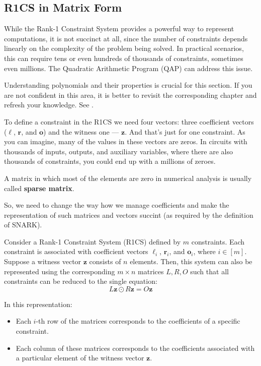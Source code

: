 \documentclass[../lecture-notes-148x210.tex]{subfiles}
\begin{document}
\subsection{R1CS in Matrix Form}

While the Rank-1 Constraint System provides a powerful way to represent computations, it is not 
succinct at all, since the number of constraints depends linearly on the complexity of the problem 
being solved. In practical scenarios, this can require tens or even hundreds of thousands of 
constraints, sometimes even millions. The Quadratic Arithmetic Program (QAP) can address this issue.

\begin{remark}
    Understanding polynomials and their properties is crucial for this section.
    If you are not confident in this area, it is better to revisit the
    corresponding chapter and refresh your knowledge. See
    .
\end{remark}

To define a constraint in the R1CS we need four vectors: three coefficient
vectors ($\boldsymbol{\ell}$, $\boldsymbol{r}$, and $\boldsymbol{o}$) and the
witness one --- $\mathbf{z}$. And that's just for one constraint. As you can
imagine, many of the values in these vectors are zeros. In circuits with
thousands of inputs, outputs, and auxiliary variables, where there are also
thousands of constraints, you could end up with a millions of zeroes.

\begin{remark}
    A matrix in which most of the elements are zero in numerical analysis is
    usually called \textbf{sparse matrix}.
\end{remark}

So, we need to change the way how we manage coefficients and make the
representation of such matrices and vectors succint (as required by the
definition of SNARK).

\begin{theorem}
    Consider a Rank-1 Constraint System (R1CS) defined by $m$ constraints. Each
    constraint is associated with coefficient vectors $\boldsymbol{\ell}_i$,
    $\boldsymbol{r}_i$, and $\boldsymbol{o}_i$, where $i \in [m]$. Suppose a
    witness vector $\mathbf{z}$ consists of $n$ elements. Then, this system can
    also be represented using the corresponding $m \times n$ matrices $L,R,O$
    such that all constraints can be reduced to the single equation:
    \begin{equation*}
        L\mathbf{z} \odot R\mathbf{z} = O\mathbf{z}
    \end{equation*}
    
    In this representation:
    \begin{itemize}
        \item Each $i$-th row of the matrices corresponds to the coefficients of a specific constraint.
        \item Each column of these matrices corresponds to the coefficients
        associated with a particular element of the witness vector $\mathbf{z}$.
    \end{itemize}
\end{theorem}
\end{document}
